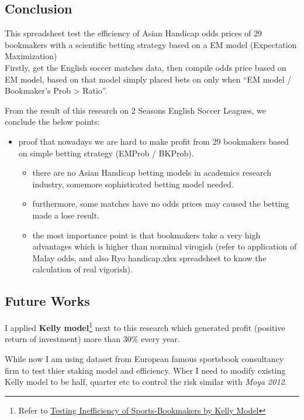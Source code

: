 \documentclass[article]{jss}
\providecommand{\tightlist}{%
  \setlength{\itemsep}{0pt}\setlength{\parskip}{0pt}}
\begin{document}
\subsection{Conclusion}\label{conclusion-1}

This spreadsheet test the efficiency of Asian Handicap odds prices of 29
bookmakers with a scientific betting strategy based on a EM model
(Expectation Maximization)\\
Firstly, get the English soccer matches data, then compile odds price
based on EM model, based on that model simply placed bets on only when
``EM model / Bookmaker's Prob \textgreater{} Ratio''. \bigbreak

From the result of this research on 2 Seasons English Soccer Leagues, we
conclude the below points:

\begin{itemize}
\tightlist
\item
  proof that nowadays we are hard to make profit from 29 bookmakers
  based on simple betting strategy (EMProb / BKProb).

  \begin{itemize}
  \tightlist
  \item
    there are no Asian Handicap betting models in academics research
    industry, somemore sophisticated betting model needed.
  \item
    furthermore, some matches have no odds prices may caused the betting
    made a lose result.
  \item
    the most importance point is that bookmakers take a very high
    advantages which is higher than norminal virogish (refer to
    application of Malay odds, and also Ryo handicap.xlsx spreadsheet to
    know the calculation of real vigorish).
  \end{itemize}
\end{itemize}

\subsection{Future Works}\label{future-works}

I applied \textbf{Kelly model}\footnote{Refer to
  \href{https://github.com/Scibrokes/Kelly-Criterion}{Testing
  Inefficiency of Sports-Bookmakers by Kelly Model}} next to this
research which generated profit (positive return of investment) more
than 30\% every year. \bigbreak

While now I am using dataset from European famous sportsbook consultancy
firm to test thier staking model and efficiency. Wher I need to modify
existing Kelly model to be half, quarter etc to control the risk similar
with \emph{Moya 2012}. \bigbreak
\end{document}
